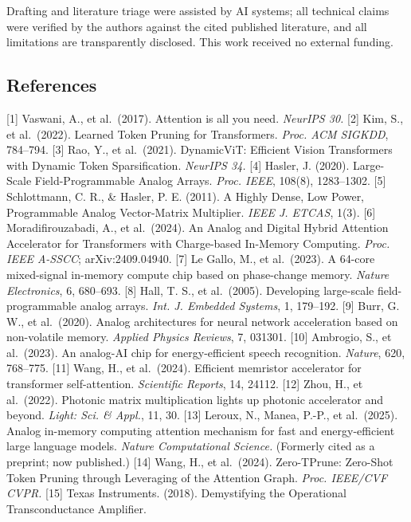 Drafting and literature triage were assisted by AI systems; all
technical claims were verified by the authors against the cited
published literature, and all limitations are transparently disclosed.
This work received no external funding.

\subsection{References}\label{references}

{[}1{]} Vaswani, A., et al.~(2017). Attention is all you need.
\emph{NeurIPS 30.} {[}2{]} Kim, S., et al.~(2022). Learned Token Pruning
for Transformers. \emph{Proc. ACM SIGKDD}, 784--794. {[}3{]} Rao, Y., et
al.~(2021). DynamicViT: Efficient Vision Transformers with Dynamic Token
Sparsification. \emph{NeurIPS 34.} {[}4{]} Hasler, J. (2020).
Large-Scale Field-Programmable Analog Arrays. \emph{Proc. IEEE}, 108(8),
1283--1302. {[}5{]} Schlottmann, C. R., \& Hasler, P. E. (2011). A
Highly Dense, Low Power, Programmable Analog Vector-Matrix Multiplier.
\emph{IEEE J. ETCAS}, 1(3). {[}6{]} Moradifirouzabadi, A., et
al.~(2024). An Analog and Digital Hybrid Attention Accelerator for
Transformers with Charge-based In-Memory Computing. \emph{Proc. IEEE
A-SSCC}; arXiv:2409.04940. {[}7{]} Le Gallo, M., et al.~(2023). A
64-core mixed-signal in-memory compute chip based on phase-change
memory. \emph{Nature Electronics}, 6, 680--693. {[}8{]} Hall, T. S., et
al.~(2005). Developing large-scale field-programmable analog arrays.
\emph{Int. J. Embedded Systems}, 1, 179--192. {[}9{]} Burr, G. W., et
al.~(2020). Analog architectures for neural network acceleration based
on non-volatile memory. \emph{Applied Physics Reviews}, 7, 031301.
{[}10{]} Ambrogio, S., et al.~(2023). An analog-AI chip for
energy-efficient speech recognition. \emph{Nature}, 620, 768--775.
{[}11{]} Wang, H., et al.~(2024). Efficient memristor accelerator for
transformer self-attention. \emph{Scientific Reports}, 14, 24112.
{[}12{]} Zhou, H., et al.~(2022). Photonic matrix multiplication lights
up photonic accelerator and beyond. \emph{Light: Sci. \& Appl.}, 11, 30.
{[}13{]} Leroux, N., Manea, P.-P., et al.~(2025). Analog in-memory
computing attention mechanism for fast and energy-efficient large
language models. \emph{Nature Computational Science.} (Formerly cited as
a preprint; now published.) {[}14{]} Wang, H., et al.~(2024).
Zero-TPrune: Zero-Shot Token Pruning through Leveraging of the Attention
Graph. \emph{Proc. IEEE/CVF CVPR.} {[}15{]} Texas Instruments. (2018).
Demystifying the Operational Transconductance Amplifier.
